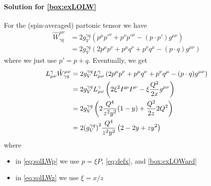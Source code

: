 \paragraph{Solution for \cref{box:exLOLW}}
For the (spin-averaged) partonic tensor we have
\begin{align}
    \hat W_{\gamma q}^{\mu\nu} &= 2 g_V^{\gamma q}\left(p^\mu p'^\nu + p^\nu p'^\mu - (p \cdot p') g^{\mu\nu}\right)\\
     &= 2g_V^{\gamma q}\left(2 p^\mu p^\nu + p^\mu q^\nu + p^\nu q^\mu - (p\cdot q) g^{\mu\nu} \right)
\end{align}
where we just use $p' = p + q$.
Eventually, we get
\begin{align}
    L^\gamma_{\mu\nu} \hat W^{\mu\nu}_{\gamma q} &= 2g_V^{\gamma q} L^\gamma_{\mu\nu} \left(2 p^\mu p^\nu + p^\mu q^\nu + p^\nu q^\mu - (p\cdot q) g^{\mu\nu} \right)\\
    &= 2g_V^{\gamma q} L^\gamma_{\mu\nu} \left(2\xi^2 P^\mu P^\nu - \xi\frac{Q^2}{2x} g^{\mu\nu}\right) \label{eq:solLWp}\\
    &= 2g_V^{\gamma q} \left(2\frac{Q^4}{z^2 y^2}(1-y) + \frac{Q^2}{2z} 2 Q^2 \right) \label{eq:solLWz}\\
    &= 2\qty(g_{V}^{\gamma q})^2\frac{Q^4}{z^2 y^2}\left(2-2y + z y^2\right)
\end{align}
where
\begin{itemize}
    \item in \cref{eq:solLWp} we use $p=\xi P$, \cref{eq:defx}, and \cref{box:exLOWard}
    \item in \cref{eq:solLWz} we use $\xi = x/z$
\end{itemize}
